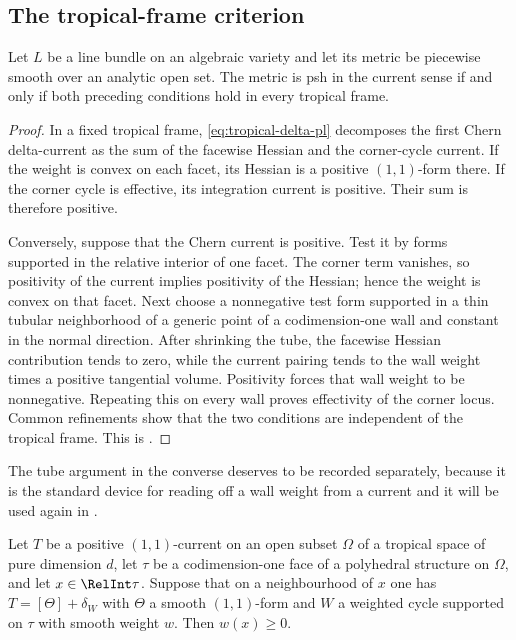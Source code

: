\subsection{The tropical-frame criterion}
\label{sec:ch18-frame-criterion}

\begin{theorem}\label{thm:gk-tropical-frame-positivity}
Let $L$ be a line bundle on an algebraic variety and let its metric be
piecewise smooth over an analytic open set.  The metric is psh in the
current sense if and only if both preceding conditions hold in every
tropical frame.
\end{theorem}
\begin{proof}
In a fixed tropical frame, \eqref{eq:tropical-delta-pl} decomposes the first
Chern delta-current as the sum of the facewise Hessian and the corner-cycle
current.  If the weight is convex on each facet, its Hessian is a positive
$(1,1)$-form there.  If the corner cycle is effective, its integration
current is positive.  Their sum is therefore positive.

Conversely, suppose that the Chern current is positive.  Test it by forms
supported in the relative interior of one facet.  The corner term vanishes,
so positivity of the current implies positivity of the Hessian; hence the
weight is convex on that facet.  Next choose a nonnegative test form supported
in a thin tubular neighborhood of a generic point of a codimension-one wall
and constant in the normal direction.  After shrinking the tube, the
facewise Hessian contribution tends to zero, while the current pairing tends
to the wall weight times a positive tangential volume.  Positivity forces
that wall weight to be nonnegative.  Repeating this on every wall proves
effectivity of the corner locus.  Common refinements show that the two
conditions are independent of the tropical frame.  This is
\cite[Theorem~8.4]{GK19}.
\end{proof}

The tube argument in the converse deserves to be recorded separately,
because it is the standard device for reading off a wall weight from a
current and it will be used again in .

\begin{lemma}
\label{lem:ch18-tube}
Let $T$ be a positive $(1,1)$-current on an open subset $\Omega$ of a
tropical space of pure dimension $d$, let $\tau$ be a codimension-one face
of a polyhedral structure on $\Omega$, and let $x\in\RelInt\tau$.  Suppose
that on a neighbourhood of $x$ one has $T=[\Theta]+\delta_W$ with $\Theta$ a
smooth $(1,1)$-form and $W$ a weighted cycle supported on $\tau$ with smooth weight
$w$.  Then $w(x)\geq0$.
\end{lemma}


